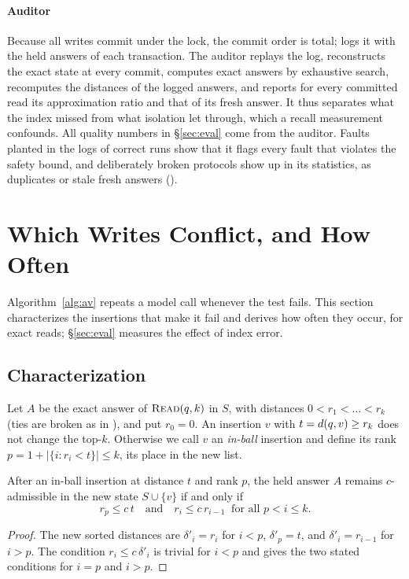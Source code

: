 \documentclass[sigconf, nonacm, review]{acmart}
\begin{document}
\paragraph{Auditor}
Because all writes commit under the lock, the commit order is total;
\sys{} logs it with the held answers of each transaction. The auditor
replays the log, reconstructs the exact state at every commit, computes
exact answers by exhaustive search, recomputes the distances of the
logged answers, and reports for every committed read its approximation
ratio and that of its fresh answer. It thus separates what the
index missed from what isolation let through, which a recall
measurement confounds. All quality numbers in \S\ref{sec:eval} come
from the auditor. Faults planted in the logs of correct runs show that
it flags every fault that violates the safety bound, and deliberately
broken protocols show up in its statistics, as duplicates or stale
fresh answers (\appAudit).

\section{Which Writes Conflict, and How Often}
\label{sec:theory}

Algorithm~\ref{alg:av} repeats a model call whenever the test fails.
This section characterizes the insertions that make it fail and derives
how often they occur, for exact reads; \S\ref{sec:eval} measures the
effect of index error.

\subsection{Characterization}

Let $A$ be the exact answer of $\textsc{Read}(q,k)$ in $S$, with distances
$0<r_1<\dots<r_k$ (ties are broken as in \appProofs), and put $r_0=0$.
An insertion $v$ with $t=d(q,v)\ge r_k$ does not change the
top-$k$. Otherwise we call $v$ an \emph{in-ball} insertion and define
its rank $p=1+|\{i: r_i<t\}|\le k$, its place in the new list.

\begin{theorem}[Characterization]
\label{thm:char}
After an in-ball insertion at distance $t$ and rank $p$, the held answer $A$
remains $c$-admissible in the new state $S\cup\{v\}$ if and only if
\[
r_p\le c\,t \quad\text{and}\quad r_i\le c\,r_{i-1}\ \text{ for all } p<i\le k .
\]
\end{theorem}
\begin{proof}
The new sorted distances are $\delta'_i=r_i$ for $i<p$, $\delta'_p=t$,
and $\delta'_i=r_{i-1}$ for $i>p$. The condition
$r_i\le c\,\delta'_i$ is trivial for $i<p$ and gives the two stated
conditions for $i=p$ and $i>p$.
\end{proof}
\end{document}
